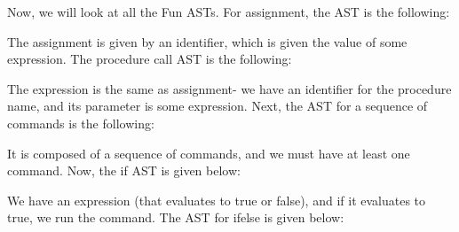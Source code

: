 \documentclass[a4paper, openany]{memoir}
\begin{document}
Now, we will look at all the Fun ASTs. For assignment, the AST is the following:
\begin{figure}[H]
    \centering
\end{figure}
\noindent The assignment is given by an identifier, which is given the value of some expression. The procedure call AST is the following:
\begin{figure}[H]
    \centering
\end{figure}
\noindent The expression is the same as assignment- we have an identifier for the procedure name, and its parameter is some expression. Next, the AST for a sequence of commands is the following:
\begin{figure}[H]
    \centering
\end{figure}
\noindent It is composed of a sequence of commands, and we must have at least one command. Now, the if AST is given below:
\begin{figure}[H]
    \centering
\end{figure}
\noindent We have an expression (that evaluates to true or false), and if it evaluates to true, we run the command. The AST for ifelse is given below:
\begin{figure}[H]
    \centering
\end{figure}
\end{document}
